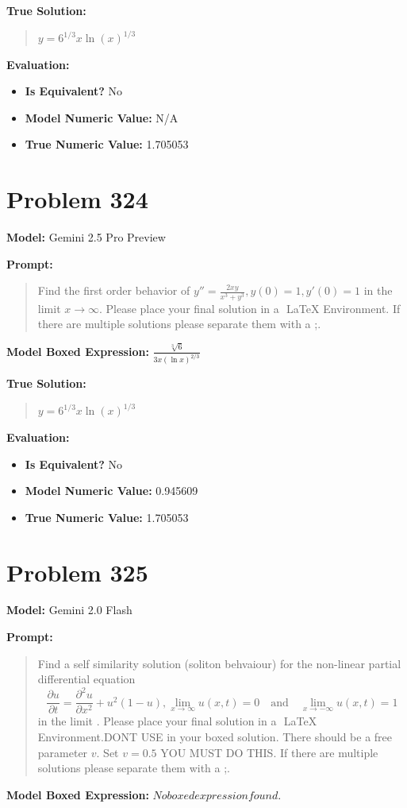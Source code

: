 \documentclass{article}
\begin{document}
{\textbf{True Solution:}
\begin{quote}
$y = 6^{1/3} x \ln(x)^{1/3}$
\end{quote}

\textbf{Evaluation:}
\begin{itemize}
\item \textbf{Is Equivalent?} No
\item \textbf{Model Numeric Value:} N/A
\item \textbf{True Numeric Value:} 1.705053
\end{itemize}
\vspace{1cm}
\section*{Problem 324}
\textbf{Model:} Gemini 2.5 Pro Preview

\textbf{Prompt:}
\begin{quote}
Find the first order behavior of $y'' = \frac{2xy}{x^3 + y^3}, y(0)=1,y'(0)=1$ in the limit $x \rightarrow \infty$. Please place your final solution in a $\boxed{}$ LaTeX Environment. If there are multiple solutions please separate them with a ;.
\end{quote}
\textbf{Model Boxed Expression:} $\frac{\sqrt[3]{6}}{3x(\ln x)^{2/3}}$

\textbf{True Solution:}
\begin{quote}
$y = 6^{1/3} x \ln(x)^{1/3}$
\end{quote}

\textbf{Evaluation:}
\begin{itemize}
\item \textbf{Is Equivalent?} No
\item \textbf{Model Numeric Value:} 0.945609
\item \textbf{True Numeric Value:} 1.705053
\end{itemize}
\vspace{1cm}
\section*{Problem 325}
\textbf{Model:} Gemini 2.0 Flash

\textbf{Prompt:}
\begin{quote}
Find a self similarity solution (soliton behvaiour) for the non-linear partial differential equation $$ \frac{\partial u}{\partial t} = \frac{\partial^2 u}{\partial x^2} + u^2 (1-u), \lim_{x \to \infty} u(x, t) = 0 \quad \text{and} \quad \lim_{x \to -\infty} u(x, t) = 1 $$ in the limit . Please place your final solution in a $\boxed{}$ LaTeX Environment.DONT USE \operatorname in your boxed solution. There should be a free parameter $v$. Set $v=0.5$ YOU MUST DO THIS. If there are multiple solutions please separate them with a ;.
\end{quote}
\textbf{Model Boxed Expression:} $No boxed expression found.$

}
\end{document}
